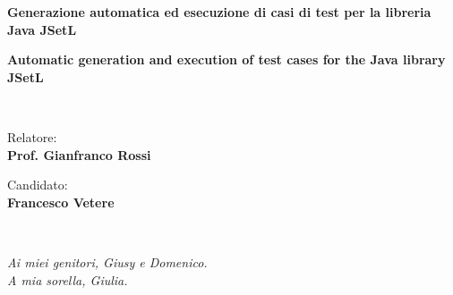 \documentclass[12pt,a4paper,oneside,openright]{article}
\begin{document}
\begin{titlepage}
    
   \begin{center}
      \LARGE{}\\
      \Large{}\\
      \LARGE\textbf{
    	Generazione automatica ed esecuzione di casi di test per la libreria Java JSetL
    	}
      
      
      \large\textbf{
      	Automatic generation and execution of test cases for the Java library JSetL
      	}
    \end{center}
    \\[3cm]
   
    \begin{minipage}[t]{0.5\textwidth}
\begin{flushleft}
\Large{Relatore:} \\
            \large\textbf{Prof. Gianfranco Rossi}
\end{flushleft}
\end{minipage}
\hfill
\begin{minipage}[t]{0.5\textwidth}
\begin{flushright}
\Large{Candidato:} \\
            \large\textbf{Francesco Vetere}
\end{flushright}
\end{minipage}\\

\begin{center}
        \Large{}
\end{center}
    
\end{titlepage}

\newpage
\thispagestyle{empty}
\mbox{}

\restoregeometry
\clearpage
\pagestyle{playn}
\begin{flushright}
\begin{dedication}
\textit{Ai miei genitori, Giusy e Domenico.\\A mia sorella, Giulia.}
\end{dedication}
\end{flushright}
\end{document}
